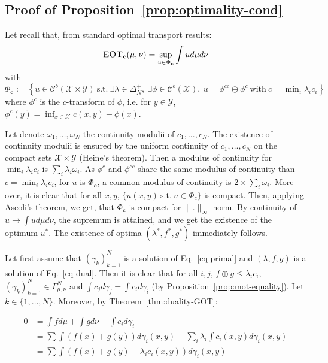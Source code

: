 \subsection{Proof of Proposition~\ref{prop:optimality-cond}}
\label{prv:optimality-cond}
\begin{prv}
Let recall that, from standard optimal transport results:
\begin{align*}
    \textsc{EOT}_\mathbf{c}(\mu,\nu) = \sup_{u\in\Phi_\mathbf{c}}\int u d\mu d\nu
\end{align*}
with $\Phi_\mathbf{c}:=\left\{u\in\mathcal{C}^b(\mathcal{\mathcal{X}\times\mathcal{Y}}) ~\mathrm{s.t.}~ \exists\lambda \in \Delta_N^+,~\exists\phi\in\mathcal{C}^b(\mathcal{X}),~ u =\phi^{cc}\oplus\phi^c~\mathrm{with}~c=\min_i\lambda_ic_i\right\}$ where $\phi^c$ is the $c$-transform of $\phi$, i.e. for $y\in\mathcal{Y}$, $\phi^c(y)=\inf_{x\in\mathcal{X}}c(x,y)-\phi(x)$. 

Let denote $\omega_1,\dots,\omega_N$ the continuity modulii of $c_1,...,c_N$. The existence of continuity modulii is ensured by the uniform continuity of $c_1,\dots,c_N$ on the compact sets $\mathcal{X}\times\mathcal{Y}$ (Heine's theorem). Then a modulus of continuity for $\min_i\lambda_ic_i$ is $\sum_i\lambda_i\omega_i$. As $\phi^c$ and $\phi^{cc}$ share the same modulus of continuity than $c=\min_i\lambda_ic_i$, for $u$ is $\Phi_\mathbf{c}$, a common modulus of continuity is $2\times\sum_i\omega_i$. More over, it is clear that for all $x,y$, $\{u(x,y)~\mathrm{s.t.}~u\in \Phi_c\}$ is compact. Then, applying Ascoli's theorem, we get, that $\Phi_{\mathbf{c}}$ is compact for $\lVert.\rVert_\infty$ norm. By continuity of $u\to\int u d\mu d\nu$, the supremum is attained, and we get the existence of the optimum $u^*$. The existence of optima $(\lambda^*,f^*,g^*)$ immediately follows.

Let first assume that $(\gamma_k)_{k=1}^N$ is a solution of Eq.~\eqref{eq-primal} and $(\lambda,f,g)$ is a solution of Eq.~\eqref{eq-dual}. Then it is clear that for all $i,j$, $f\oplus g\leq \lambda_ic_i$, $(\gamma_k)_{k=1}^N\in\Gamma^N_{\mu,\nu}$ and $\int c_jd\gamma_j=\int c_id\gamma_i$ (by Proposition~\ref{prop:mot-equality}). Let $k\in\{1,\dots,N\}$. Moreover, by Theorem~\ref{thm:duality-GOT}:

\begin{align*}
   0&=\int fd\mu +\int gd\nu -\int c_id\gamma_i\\
    & = \sum \int (f(x)+g(y)) d\gamma_i(x,y)-\sum_i\lambda_i\int c_i(x,y) d\gamma_i(x,y)\\
    & = \sum \int (f(x)+g(y)-\lambda_ic_i(x,y)) d\gamma_i(x,y)\\
\end{align*}


\end{prv}

